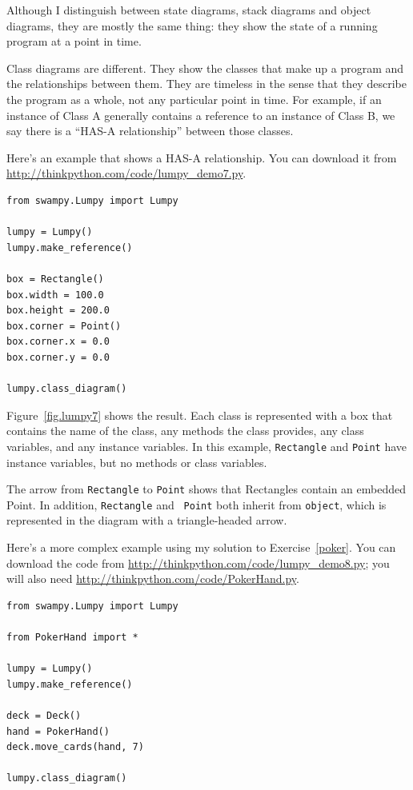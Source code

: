 \documentclass[10pt]{book}
\begin{document}
Although I distinguish between state diagrams, stack diagrams and
object diagrams, they are mostly the same thing: they show the
state of a running program at a point in time.

Class diagrams are different.  They show the classes that make up a
program and the relationships between them.  They are timeless in the
sense that they describe the program as a whole, not any particular
point in time.  For example, if an instance of Class A generally
contains a reference to an instance of Class B, we say there is a
``HAS-A relationship'' between those classes.

Here's an example that shows a HAS-A relationship.  You can download
it from \url{http://thinkpython.com/code/lumpy_demo7.py}.

\begin{verbatim}
from swampy.Lumpy import Lumpy

lumpy = Lumpy()
lumpy.make_reference()

box = Rectangle()
box.width = 100.0
box.height = 200.0
box.corner = Point()
box.corner.x = 0.0
box.corner.y = 0.0

lumpy.class_diagram()
\end{verbatim}

Figure~\ref{fig.lumpy7} shows the result.
Each class is represented with a box that contains the name of the
class, any methods the class provides, any class variables, and
any instance variables.  In this example, {\tt Rectangle} and {\tt Point}
have instance variables, but no methods or class variables.

The arrow from {\tt Rectangle} to {\tt Point} shows that Rectangles
contain an embedded Point.  In addition, {\tt Rectangle} and {\tt
  Point} both inherit from {\tt object}, which is represented in
the diagram with a triangle-headed arrow.

Here's a more complex example using my solution to Exercise~\ref{poker}.
You can download
the code from \url{http://thinkpython.com/code/lumpy_demo8.py};
you will also need \url{http://thinkpython.com/code/PokerHand.py}.

\begin{verbatim}
from swampy.Lumpy import Lumpy

from PokerHand import *

lumpy = Lumpy()
lumpy.make_reference()

deck = Deck()
hand = PokerHand()
deck.move_cards(hand, 7)

lumpy.class_diagram()
\end{verbatim}
\end{document}
